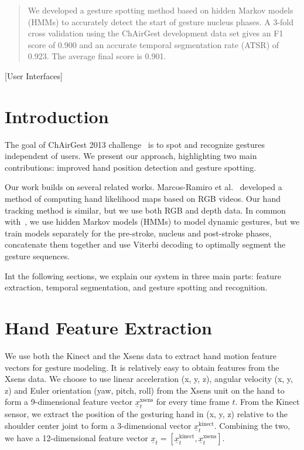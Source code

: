 \documentclass{acm_proc_article-sp}
\begin{document}
\maketitle
\begin{abstract}
We developed a gesture spotting method based on hidden Markov models (HMMs) to accurately detect the start of gesture nucleus phases.
A 3-fold cross validation using the ChAirGest development data set gives an F1 score of 0.900
and an accurate temporal segmentation rate (ATSR) of 0.923. The average final score is 0.901.
\end{abstract}

[User Interfaces]


\section{Introduction}
The goal of ChAirGest 2013 challenge~\cite{Ruffieux2013} is to spot and recognize gestures independent of
users. We present our approach, highlighting two main contributions: 
improved hand position detection and gesture spotting.

Our work builds on several related works. Marcos-Ramiro et al.~\cite{marcos2013} developed a method of computing hand likelihood maps based on RGB videos. 
Our hand tracking method is similar, but we use both RGB and depth data. 
In common with~\cite{Starner95, yin10}, we use hidden Markov models (HMMs) to model dynamic gestures,
but we train models separately for the pre-stroke, nucleus and post-stroke phases, concatenate them together and use Viterbi decoding to optimally segment the
gesture sequences. 

Int the following sections, we explain our system in three main parts: feature extraction, temporal segmentation, and gesture
spotting and recognition.  

\section{Hand Feature Extraction}
We use both the Kinect and the Xsens data to extract hand motion feature vectors for gesture modeling. 
It is relatively easy to obtain features from the Xsens data. We choose to use linear
acceleration (x, y, z), angular velocity (x, y, z) and Euler orientation (yaw, pitch, roll)
from the Xsens unit on the hand to form a 9-dimensional feature vector $\underline{x}_t^{\text{xsens}}$
for every time frame $t$.
From the Kinect sensor, we extract the position of the gesturing hand in (x, y, z) relative to
the shoulder center joint to
form a 3-dimensional vector $\underline{x}_t^{\text{kinect}}$. Combining the two, we
have a 12-dimensional feature vector $\underline{x}_t = [\underline{x}^\text{kinect}_t, \underline{x}^\text{xsens}_t]$.
\end{document}
